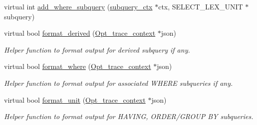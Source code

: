 \begin{DoxyCompactItemize}
\item 
virtual int \mbox{\hyperlink{classopt__explain__json__namespace_1_1context_ae6606674e90fec03200823c35994873c}{add\+\_\+where\+\_\+subquery}} (\mbox{\hyperlink{classopt__explain__json__namespace_1_1subquery__ctx}{subquery\+\_\+ctx}} $\ast$ctx, S\+E\+L\+E\+C\+T\+\_\+\+L\+E\+X\+\_\+\+U\+N\+IT $\ast$subquery)
\item 
\mbox{\label{classopt__explain__json__namespace_1_1context_ad1115db1bcc46cb51db9dd16b498f7d0}} 
virtual bool \mbox{\hyperlink{classopt__explain__json__namespace_1_1context_ad1115db1bcc46cb51db9dd16b498f7d0}{format\+\_\+derived}} (\mbox{\hyperlink{classOpt__trace__context}{Opt\+\_\+trace\+\_\+context}} $\ast$json)
\begin{DoxyCompactList}\small\item\em Helper function to format output for derived subquery if any. \end{DoxyCompactList}\item 
\mbox{\label{classopt__explain__json__namespace_1_1context_a16c25060651ebc4057ec7e4c712556ef}} 
virtual bool \mbox{\hyperlink{classopt__explain__json__namespace_1_1context_a16c25060651ebc4057ec7e4c712556ef}{format\+\_\+where}} (\mbox{\hyperlink{classOpt__trace__context}{Opt\+\_\+trace\+\_\+context}} $\ast$json)
\begin{DoxyCompactList}\small\item\em Helper function to format output for associated W\+H\+E\+RE subqueries if any. \end{DoxyCompactList}\item 
\mbox{\label{classopt__explain__json__namespace_1_1context_a40a30a46748f214736cd27e9dcc2b495}} 
virtual bool \mbox{\hyperlink{classopt__explain__json__namespace_1_1context_a40a30a46748f214736cd27e9dcc2b495}{format\+\_\+unit}} (\mbox{\hyperlink{classOpt__trace__context}{Opt\+\_\+trace\+\_\+context}} $\ast$json)
\begin{DoxyCompactList}\small\item\em Helper function to format output for H\+A\+V\+I\+NG, O\+R\+D\+E\+R/\+G\+R\+O\+UP BY subqueries. \end{DoxyCompactList}\end{DoxyCompactItemize}
